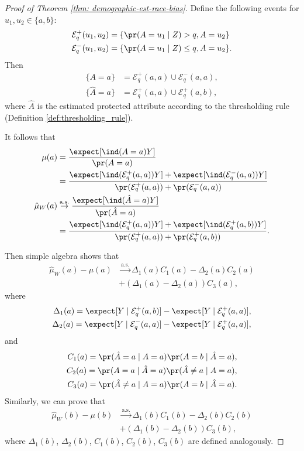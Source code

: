 \begin{appendices}
\begin{proof}[Proof of Theorem \ref{thm: demographic-est-race-bias}]
Define the following events for $u_1, u_2 \in \{a, b\}$:
\begin{align*}
 \mathcal{E}_q^+(u_1, u_2) &= \{\pr (A = u_1 \mid Z) > q, A = u_2\} \\
 \mathcal{E}_q^-(u_1, u_2) &= \{ \pr (A = u_1 \mid Z) \le q, A = u_2\}.
\end{align*}
Then
\begin{align*}
    \{A = a\} &= \mathcal{E}_q^+(a, a) \cup \mathcal{E}_q^-(a, a), \\
    \{\hat{A} = a\} &= \mathcal{E}_q^+(a, a) \cup \mathcal{E}_q^+(a, b),
\end{align*}
where $\hat{A}$ is the estimated protected attribute according to the thresholding rule (Definition \ref{def:thresholding_rule}).

It follows that
\begin{align*}
    \mu(a) &= \frac{\expect [\ind (A = a)Y]}{\pr(A = a)} \\
    &= \frac{\expect [\ind (\mathcal{E}_q^+(a, a))Y] + \expect [\ind (\mathcal{E}_q^-(a, a))Y]}{\pr(\mathcal{E}_q^+(a, a)) + \pr(\mathcal{E}_q^-(a, a))} \\
    \hat{\mu}_W(a) &\overset{\text{a.s.}}{\to} \frac{\expect [\ind (\hat{A} = a)Y]}{\pr(\hat{A} = a)}  \\
    &= \frac{\expect [\ind (\mathcal{E}_q^+(a, a))Y] + \expect [\ind (\mathcal{E}_q^+(a, b))Y]}{\pr(\mathcal{E}_q^+(a, a)) + \pr(\mathcal{E}_q^+(a, b))}.
\end{align*}

Then simple algebra shows that
\begin{align*}
    \hat{\mu}_W(a) - \mu(a) &\overset{\text{a.s.}}{\to} \Delta_1(a)C_1(a) - \Delta_2(a)C_2(a) \\
    &+ (\Delta_1(a) - \Delta_2(a))C_3(a),
\end{align*}
where
\begin{align*}
    \Delta_1(a) = \expect[Y \mid \mathcal{E}_q^+(a, b)] - \expect[Y \mid \mathcal{E}_q^+(a, a)], \\
    \Delta_2(a) = \expect[Y \mid \mathcal{E}_q^-(a, a)] - \expect[Y \mid \mathcal{E}_q^+(a, a)],
\end{align*}
and
\begin{align*}
    C_1(a) = \pr(\hat{A} = a \mid A = a)\pr(A = b \mid \hat{A} = a), \\
    C_2(a) = \pr(A = a \mid \hat{A} = a)\pr(\hat{A} \ne a \mid A = a), \\
    C_3(a) = \pr(\hat{A} \ne a \mid A = a)\pr(A = b \mid \hat{A} = a).
\end{align*}
Similarly, we can prove that
\begin{align*}
    \hat{\mu}_W(b) - \mu(b) &\overset{\text{a.s.}}{\to} \Delta_1(b)C_1(b) - \Delta_2(b)C_2(b) \\
    &+ (\Delta_1(b) - \Delta_2(b))C_3(b),
\end{align*}
where $\Delta_1(b)$, $\Delta_2(b)$, $C_1(b)$, $C_2(b)$, $C_3(b)$ are defined analogously.


\end{proof}
\end{appendices}
